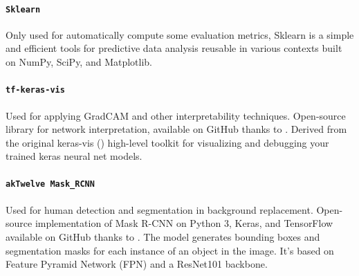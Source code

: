 \paragraph*{\texttt{Sklearn}}
Only used for automatically compute some evaluation metrics, Sklearn is a simple and efficient tools for predictive data analysis reusable in various contexts built on NumPy, SciPy, and Matplotlib.

\paragraph*{\texttt{tf-keras-vis}}
Used for applying GradCAM and other interpretability techniques. Open-source library for network interpretation, available on GitHub thanks to \cite{tf-keras-vis}. Derived from the original keras-vis (\cite{keras-vis}) high-level toolkit for visualizing and debugging your trained keras neural net models.

\paragraph*{\texttt{akTwelve Mask\_RCNN}}
Used for human detection and segmentation in background replacement. Open-source implementation of Mask R-CNN on Python 3, Keras, and TensorFlow available on GitHub thanks to \cite{MaskRCNN_akTwelve}. The model generates bounding boxes and segmentation masks for each instance of an object in the image. It's based on Feature Pyramid Network (FPN) and a ResNet101 backbone.








